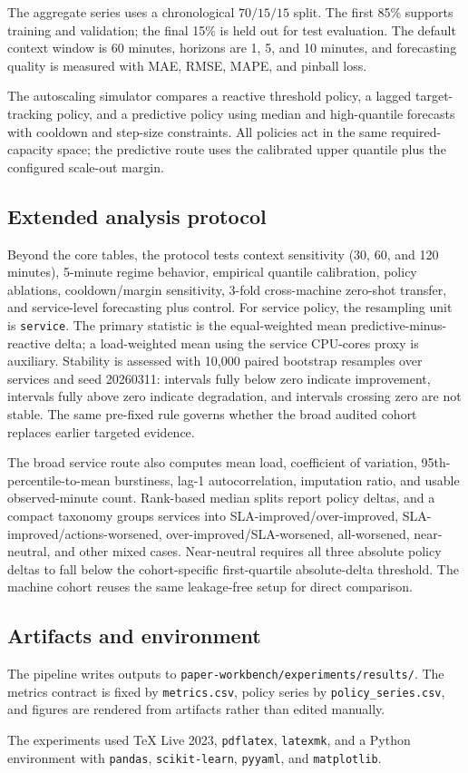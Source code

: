 The aggregate series uses a chronological $70/15/15$ split. The first 85\% supports training and validation; the final 15\% is held out for test evaluation. The default context window is 60 minutes, horizons are 1, 5, and 10 minutes, and forecasting quality is measured with MAE, RMSE, MAPE, and pinball loss.

The autoscaling simulator compares a reactive threshold policy, a lagged target-tracking policy, and a predictive policy using median and high-quantile forecasts with cooldown and step-size constraints. All policies act in the same required-capacity space; the predictive route uses the calibrated upper quantile plus the configured scale-out margin.

\subsection{Extended analysis protocol}

Beyond the core tables, the protocol tests context sensitivity (30, 60, and 120 minutes), 5-minute regime behavior, empirical quantile calibration, policy ablations, cooldown/margin sensitivity, 3-fold cross-machine zero-shot transfer, and service-level forecasting plus control. For service policy, the resampling unit is \texttt{service}. The primary statistic is the equal-weighted mean predictive-minus-reactive delta; a load-weighted mean using the service CPU-cores proxy is auxiliary. Stability is assessed with 10{,}000 paired bootstrap resamples over services and seed 20260311: intervals fully below zero indicate improvement, intervals fully above zero indicate degradation, and intervals crossing zero are not stable. The same pre-fixed rule governs whether the broad audited cohort replaces earlier targeted evidence.

The broad service route also computes mean load, coefficient of variation, 95th-percentile-to-mean burstiness, lag-1 autocorrelation, imputation ratio, and usable observed-minute count. Rank-based median splits report policy deltas, and a compact taxonomy groups services into SLA-improved/over-improved, SLA-improved/actions-worsened, over-improved/SLA-worsened, all-worsened, near-neutral, and other mixed cases. Near-neutral requires all three absolute policy deltas to fall below the cohort-specific first-quartile absolute-delta threshold. The machine cohort reuses the same leakage-free setup for direct comparison.

\subsection{Artifacts and environment}

The pipeline writes outputs to \texttt{paper-workbench/experiments/results/}. The metrics contract is fixed by \texttt{metrics.csv}, policy series by \texttt{policy\_series.csv}, and figures are rendered from artifacts rather than edited manually.

The experiments used TeX Live 2023, \texttt{pdflatex}, \texttt{latexmk}, and a Python environment with \texttt{pandas}, \texttt{scikit-learn}, \texttt{pyyaml}, and \texttt{matplotlib}.
